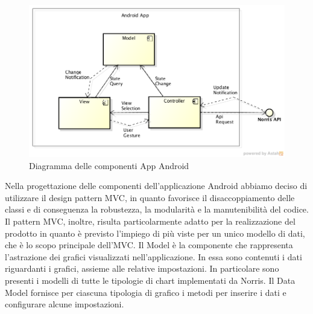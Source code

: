 	\begin{figure}[H]\centering
        \includegraphics[width=\textwidth]{SpecificaTecnica/Pics/AndroidAppComponentDiagramLevel0.png}
        \caption{Diagramma delle componenti App Android}
    \end{figure}
	Nella progettazione delle componenti dell'applicazione Android abbiamo deciso di utilizzare il design pattern MVC, in quanto favorisce il disaccoppiamento delle classi e di conseguenza la robustezza, la modularità e la manutenibilità del codice. \\
Il pattern MVC, inoltre, risulta particolarmente adatto per la realizzazione del prodotto in quanto è previsto l'impiego di più viste per un unico modello di dati, che è lo scopo principale dell'MVC.
        Il Model è la componente che rappresenta l'astrazione dei grafici visualizzati nell'applicazione. In essa sono contenuti i dati riguardanti i grafici, assieme alle relative impostazioni. In particolare sono presenti i modelli di tutte le tipologie di chart implementati da Norris. Il Data Model fornisce per ciascuna tipologia di grafico i metodi per inserire i dati e configurare alcune impostazioni. 
    
